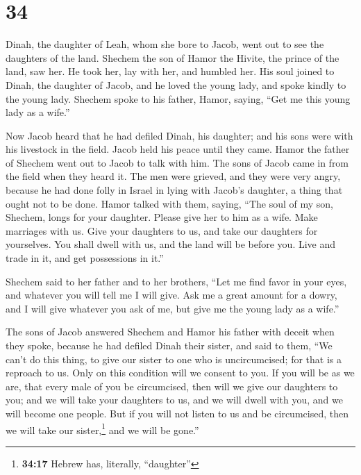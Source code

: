 \hypertarget{section-33}{%
\section{34}\label{section-33}}

 Dinah, the daughter of Leah, whom she bore to Jacob, went
out to see the daughters of the land.  Shechem the son of
Hamor the Hivite, the prince of the land, saw her. He took her, lay with
her, and humbled her.  His soul joined to Dinah, the
daughter of Jacob, and he loved the young lady, and spoke kindly to the
young lady.  Shechem spoke to his father, Hamor, saying,
``Get me this young lady as a wife.''

 Now Jacob heard that he had defiled Dinah, his daughter;
and his sons were with his livestock in the field. Jacob held his peace
until they came.  Hamor the father of Shechem went out to
Jacob to talk with him.  The sons of Jacob came in from
the field when they heard it. The men were grieved, and they were very
angry, because he had done folly in Israel in lying with Jacob's
daughter, a thing that ought not to be done.  Hamor talked
with them, saying, ``The soul of my son, Shechem, longs for your
daughter. Please give her to him as a wife.  Make
marriages with us. Give your daughters to us, and take our daughters for
yourselves.  You shall dwell with us, and the land will
be before you. Live and trade in it, and get possessions in it.''

 Shechem said to her father and to her brothers, ``Let me
find favor in your eyes, and whatever you will tell me I will give.
 Ask me a great amount for a dowry, and I will give
whatever you ask of me, but give me the young lady as a wife.''

 The sons of Jacob answered Shechem and Hamor his father
with deceit when they spoke, because he had defiled Dinah their sister,
 and said to them, ``We can't do this thing, to give our
sister to one who is uncircumcised; for that is a reproach to us.
 Only on this condition will we consent to you. If you
will be as we are, that every male of you be circumcised,
 then will we give our daughters to you; and we will take
your daughters to us, and we will dwell with you, and we will become one
people.  But if you will not listen to us and be
circumcised, then we will take our sister,\footnote{\textbf{34:17}
  Hebrew has, literally, ``daughter''} and we will be gone.''

